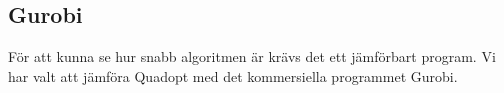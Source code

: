 \subsection{Gurobi}
För att kunna se hur snabb algoritmen är krävs det ett jämförbart program. Vi har valt att jämföra Quadopt med det kommersiella programmet Gurobi.
\begin{LIPSaktivitetslista}
\end{LIPSaktivitetslista}
